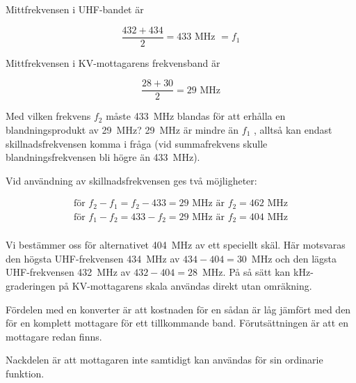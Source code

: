 Mittfrekvensen i UHF-bandet är

\[\frac{432+434}{2} = 433\text{ MHz } = f_1\]

Mittfrekvensen i KV-mottagarens frekvensband är

\[\frac{28 + 30}{2} = 29\text{ MHz}\]

Med vilken frekvens \(f_2\) måste 433~MHz blandas för att erhålla en
blandningsprodukt av 29~MHz?
29~MHz är mindre än \(f_1\) , alltså kan endast skillnadsfrekvensen komma i
fråga (vid summafrekvens skulle blandningsfrekvensen bli högre än 433~MHz).

Vid användning av skillnadsfrekvensen ges två möjligheter:

\begin{gather*}
  \text{för }f_2 - f_1 = f_2 - 433 = 29\text{ MHz är }f_2 = 462\text{ MHz} \\
  \text{för }f_1 - f_2 = 433 - f_2 = 29\text{ MHz är }f_2 = 404\text{ MHz} \\
\end{gather*}

Vi bestämmer oss för alternativet 404~MHz av ett speciellt skäl.
Här motsvaras den högsta UHF-frekvensen 434~MHz av \(434 - 404 = 30\)~MHz
och den lägsta UHF-frekvensen 432~MHz av \(432 - 404 = 28\)~MHz.
På så sätt kan kHz-graderingen på KV-mottagarens skala användas direkt utan
omräkning.

Fördelen med en konverter är att kostnaden för en sådan är låg jämfört
med den för en komplett mottagare för ett tillkommande band.
Förutsättningen är att en mottagare redan finns.

Nackdelen är att mottagaren inte samtidigt kan användas för sin
ordinarie funktion.
